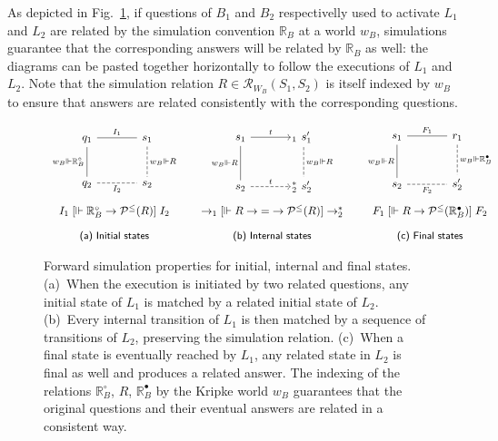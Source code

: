\documentclass[11pt,oneside,draft]{book}
\theoremstyle{definition}
\newcommand{\ifr}[1]{\mathrel{[{#1}]}}
\newcommand{\que}{\circ}         %
\newcommand{\ans}{\bullet}       %
\begin{document}
As depicted in Fig.~\ref{fig:fsim},
if questions of $B_1$ and $B_2$
respectivelly used to activate $L_1$ and $L_2$
are related by the simulation convention $\mathbb{R}_B$
at a world $w_B$,
simulations guarantee that the corresponding answers will be related
by $\mathbb{R}_B$ as well:
the diagrams
can be pasted together horizontally
to follow the executions of $L_1$ and $L_2$.
Note that
the simulation relation $R \in \mathcal{R}_{W_B}(S_1, S_2)$
is itself indexed by $w_B$
to ensure that answers
are related consistently with the corresponding questions.

\begin{figure} %
  \[
    \begin{array}{c@{\qquad}c@{\qquad}c}
      \begin{tikzcd}[sep=large]
        q_1 \ar[d, "w_B \Vdash \mathbb{R}_B^\que"', dash] \ar[r, dash, "I_1"] &
        s_1 \ar[d, "w_B \Vdash R", dash, dashed] \\
        q_2 \ar[r, "I_2"', dash, dashed] &
        s_2
      \end{tikzcd}
      &
      \begin{tikzcd}[sep=large]
        s_1 \ar[r, "t"] \ar[d, "w_B \Vdash R"', dash] &
        \!\!{}_1 \:\, s_1' \ar[d, "w_B \Vdash R", dash, dashed] \\
        s_2 \ar[r, "t", dashed] &
        \!\!{}_2^* \:\, s_2'
      \end{tikzcd}
      &
      \begin{tikzcd}[sep=large]
        s_1 \ar[r, "F_1", dash] \ar[d, "w_B \Vdash R"', dash] &
        r_1 \ar[d, "w_B \Vdash \mathbb{R}_B^\ans", dash, dashed] \\
        s_2 \ar[r, "F_2"', dash, dashed] &
        s_2'
      \end{tikzcd}
      \\[3.5em]
      I_1 \ifr{\Vdash \mathbb{R}_B^\que \rightarrow \mathcal{P}^\le(R)} I_2
      &
      {\rightarrow_1}
      \ifr{\Vdash R \rightarrow {=} \rightarrow \mathcal{P}^\le(R)}
      {\rightarrow_2^*}
      &
      F_1
      \ifr{\Vdash R \rightarrow \mathcal{P}^\le(\mathbb{R}_B^\ans)}
      F_2
      \\[1em]
      \small \textsf{(a) Initial states} &
      \small \textsf{(b) Internal states} &
      \small \textsf{(c) Final states}
    \end{array}
  \]
  \caption[Forward simulation properties]%
   {Forward simulation properties for initial, internal and final states.
    (a)~When the execution is initiated by two related questions,
    any initial state of $L_1$ is matched by
    a related initial state of $L_2$.
    (b)~Every internal transition of $L_1$ is then matched by
    a sequence of transitions of $L_2$,
    preserving the simulation relation.
    (c)~When a final state is eventually reached by $L_1$,
    any related state in $L_2$ is final as well and
    produces a related answer.
    The indexing of the relations
    $\mathbb{R}_B^\que$, $R$, $\mathbb{R}_B^\ans$
    by the Kripke world $w_B$
    guarantees that the original questions and their eventual answers
    are related in a consistent way.}
  \label{fig:fsim}
\end{figure}
\end{document}
